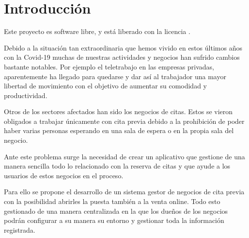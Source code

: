 \chapter{Introducción}

Este proyecto es software libre, y está liberado con la licencia \cite{gplv3}.

Debido a la situación tan extraordinaria que hemos vivido en estos últimos años con la Covid-19
muchas de nuestras actividades y negocios han sufrido cambios bastante notables.
Por ejemplo el teletrabajo en las empresas privadas, aparentemente ha llegado para
quedarse y dar así al trabajador una mayor libertad de movimiento con el objetivo de
aumentar su comodidad y productividad.

Otros de los sectores afectados han sido los negocios de citas. Estos se vieron obligados
a trabajar únicamente con cita previa debido a la prohibición de poder haber varias personas
esperando en una sala de espera o en la propia sala del negocio.

Ante este problema surge la necesidad de crear un aplicativo que gestione de una manera
sencilla todo lo relacionado con la reserva de citas y que ayude a los usuarios de estos negocios en el proceso.

Para ello se propone el desarrollo de un sistema gestor de negocios de cita previa con la posibilidad abrirles la puesta también a la venta online. Todo esto gestionado de una manera centralizada en la que los dueños de los negocios podrán configurar a su manera su entorno y gestionar toda la información registrada. 